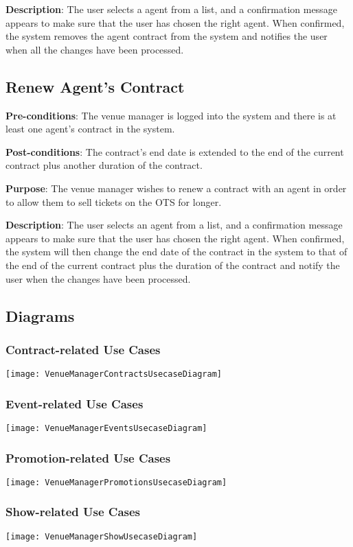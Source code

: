 \textbf{Description}: The user selects a agent from a list, and a confirmation message appears to make sure that the user has chosen the right agent. When confirmed, the system removes the agent contract from the system and notifies the user when all the changes have been processed.

\subsection{Renew Agent's Contract}
\textbf{Pre-conditions}: The venue manager is logged into the system and there is at least one agent's contract in the system.

\textbf{Post-conditions}: The contract's end date is extended to the end of the current contract plus another duration of the contract.

\textbf{Purpose}: The venue manager wishes to renew a contract with an agent in order to allow them to sell tickets on the OTS for longer.

\textbf{Description}: The user selects an agent from a list, and a confirmation message appears to make sure that the user has chosen the right agent. When confirmed, the system will then change the end date of the contract in the system to that of the end of the current contract plus the duration of the contract and notify the user when the changes have been processed.

\subsection{Diagrams}

\subsubsection{Contract-related Use Cases}
\texttt{[image: VenueManagerContractsUsecaseDiagram]}

\subsubsection{Event-related Use Cases}
\texttt{[image: VenueManagerEventsUsecaseDiagram]}

\subsubsection{Promotion-related Use Cases}
\texttt{[image: VenueManagerPromotionsUsecaseDiagram]}

\subsubsection{Show-related Use Cases}
\texttt{[image: VenueManagerShowUsecaseDiagram]}
